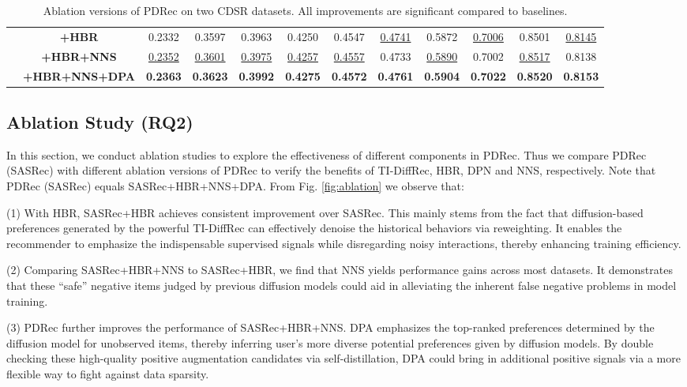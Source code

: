\documentclass[letterpaper]{article} %
\begin{document}
\begin{table}[!t]
\begin{tabular}{|c|c|c|c|c|c|c|c|c|c|c|c|}
    & \textbf{+HBR}        & 0.2332 & 0.3597 & 0.3963 & 0.4250 & 0.4547 & \underline{0.4741} & 0.5872 & \underline{0.7006} & 0.8501 & \underline{0.8145} \\
    & \textbf{+HBR+NNS}     & \underline{0.2352} & \underline{0.3601} & \underline{0.3975} & \underline{0.4257} & \underline{0.4557} & 0.4733 & \underline{0.5890}  & 0.7002 & \underline{0.8517} & 0.8138 \\
    & \textbf{+HBR+NNS+DPA}  & \textbf{0.2363} & \textbf{0.3623} & \textbf{0.3992} & \textbf{0.4275} & \textbf{0.4572} & \textbf{0.4761} & \textbf{0.5904} & \textbf{0.7022} & \textbf{0.8520} & \textbf{0.8153} \\ \hline
\end{tabular}
\caption{Ablation versions of PDRec on two CDSR datasets. All improvements are significant compared to baselines.}
\label{tab:Ablation_CDSR}
\end{table}


\subsection{Ablation Study (RQ2)}
\label{sec.ablation}
In this section, we conduct ablation studies to explore the effectiveness of different components in PDRec.
Thus we compare PDRec (SASRec) with different ablation versions of PDRec to verify the benefits of TI-DiffRec, HBR, DPN and NNS, respectively. Note that PDRec (SASRec) equals SASRec+HBR+NNS+DPA. From Fig. \ref{fig:ablation} we observe that:

(1) With HBR, SASRec+HBR achieves consistent improvement over SASRec. This mainly stems from the fact that diffusion-based preferences generated by the powerful TI-DiffRec can effectively denoise the historical behaviors via reweighting. It enables the recommender to emphasize the indispensable supervised signals while disregarding noisy interactions, thereby enhancing training efficiency.

(2) Comparing SASRec+HBR+NNS to SASRec+HBR, we find that NNS yields performance gains across most datasets. It demonstrates that these ``safe'' negative items judged by previous diffusion models could aid in alleviating the inherent false negative problems in model training.

(3) PDRec further improves the performance of SASRec+HBR+NNS. DPA emphasizes the top-ranked preferences determined by the diffusion model for unobserved items, thereby inferring user's more diverse potential preferences given by diffusion models. By double checking these high-quality positive augmentation candidates via self-distillation, DPA could bring in additional positive signals via a more flexible way to fight against data sparsity.
\end{document}
